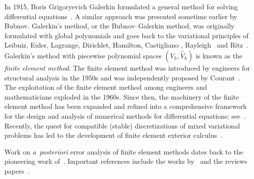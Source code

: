 In 1915, Boris Grigoryevich Galerkin formulated a general method for
solving differential equations~\citep{Galerkin1915}. A similar
approach was presented sometime earlier by Bubnov. Galerkin's method,
or the Bubnov--Galerkin method, was originally formulated with global
polynomials and goes back to the variational principles of Leibniz,
Euler, Lagrange, Dirichlet, Hamilton,
Castigliano \citep{Castigliano1879}, Rayleigh~\citep{Rayleigh1870} and
Ritz~\citep{Ritz1908}. Galerkin's method with piecewise polynomial
spaces $(V_h, \hat{V}_h)$ is known as the \emph{finite element
  method}. The finite element method was introduced by engineers for
structural analysis in the 1950s and was independently proposed by
Courant~\citep{Courant1943}. The exploitation of the finite element
method among engineers and mathematicians exploded in the 1960s. Since
then, the machinery of the finite element method has been expanded and
refined into a comprehensive framework for the design and analysis of
numerical methods for differential equations;
see~\citet{ZienkiewiczTaylorZhu2005firstpublishedin1967,StrangFix1973,Ciarlet1976,BeckerCareyOden1981,Hughes1987,BrennerScott2008}.
Recently, the quest for compatible (stable) discretizations of mixed
variational problems has led to the development of finite element
exterior calculus~\citep{ArnoldFalkWinther2006}.

Work on \emph{a~posteriori} error analysis of finite element methods
dates back to the pioneering work
of~\citet{BabuvskaRheinboldt1978}. Important references include the
works by~\citet{BankWeiser1985,ZienkiewiczZhu1987,
  ErikssonJohnson1991,ErikssonJohnson1995a,ErikssonJohnsonIII,ErikssonJohnson1995b,ErikssonJohnson1995c,ErikssonJohnsonLarsson1998,AinsworthOden1993}
and the reviews
papers~\citep{ErikssonEstepEtAl1995,Verfurth1994,Verfurth1999,AinsworthOden2000,BeckerRannacher2001}.
